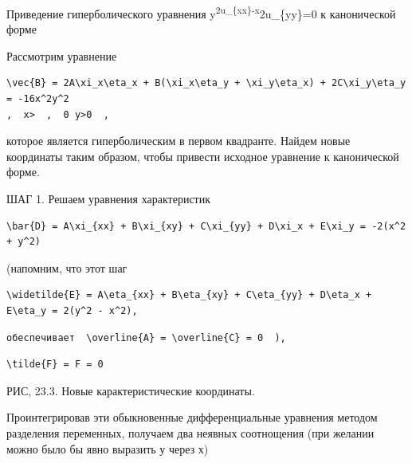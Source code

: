 \documentclass[
  ukrainian,
]{article}
\begin{document}
Приведение гиперболического уравнения
y\textsuperscript{2u\_\{xx\}-x}2u\_\{yy\}=0 к канонической форме

Рассмотрим уравнение

\begin{verbatim}
\vec{B} = 2A\xi_x\eta_x + B(\xi_x\eta_y + \xi_y\eta_x) + 2C\xi_y\eta_y = -16x^2y^2
,  x>  ,  0 y>0  ,
\end{verbatim}

которое является гиперболическим в первом квадранте. Найдем новые
координаты таким образом, чтобы привести исходное уравнение к
канонической форме.

ШАГ 1. Решаем уравнения характеристик

\begin{verbatim}
\bar{D} = A\xi_{xx} + B\xi_{xy} + C\xi_{yy} + D\xi_x + E\xi_y = -2(x^2 + y^2)
\end{verbatim}

(напомним, что этот шаг

\begin{verbatim}
\widetilde{E} = A\eta_{xx} + B\eta_{xy} + C\eta_{yy} + D\eta_x + E\eta_y = 2(y^2 - x^2),
\end{verbatim}

\begin{verbatim}
обеспечивает  \overline{A} = \overline{C} = 0  ),
\end{verbatim}

\begin{verbatim}
\tilde{F} = F = 0
\end{verbatim}

РИС, 23.3. Новые карактеристические координаты.

Проинтегрировав эти обыкновенные дифференциальные уравнения методом
разделения переменных, получаем два неявных соотнощения (при желании
можно было бы явно выразить у через х)
\end{document}
